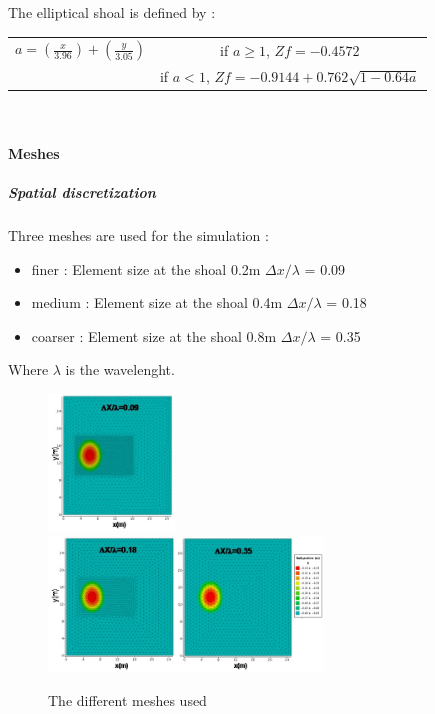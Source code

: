\vspace{1cm}

The elliptical shoal is defined by :\\
\begin{center}

\begin{tabular}{c|c}
$a = (\frac{x}{3.96})+(\frac{y}{3.05})$ & if $a \geq 1$, $Zf = -0.4572$\\
 & if $a < 1$, $Zf = -0.9144+0.762 \sqrt{1-0.64a}$
\end{tabular}\\
\end{center}
\paragraph{Meshes}
\subparagraph{Spatial discretization}
Three meshes are used for the simulation :
\begin{itemize}
\item finer : Element size at the shoal 0.2m \quad $\Delta x/\lambda$ = 0.09
\item medium : Element size at the shoal 0.4m \quad $\Delta x/\lambda$ = 0.18
\item coarser : Element size at the shoal 0.8m \quad $\Delta x/\lambda$ = 0.35
\end{itemize}

Where $\lambda$ is the wavelenght.
\begin{figure}[h!]
  \centering
    \includegraphics[width=0.3\textwidth]{mesh009.jpg}\\
    \includegraphics[width=0.65\textwidth]{meshes018035.jpg}
      \caption{The different meshes used}
\label{meshshoal}
\end{figure}

